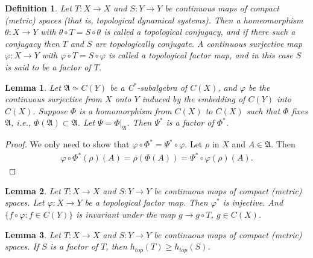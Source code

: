 \documentclass[a4paper,10pt]{amsart}
\newtheorem{definition}{Definition}[section]
\newtheorem{lemma}{Lemma}[section]
\newcommand{\AAA}{\mathfrak A}
\begin{document}
\begin{definition}
Let $T: X \rightarrow X$ and $S:Y \rightarrow Y$ be continuous maps
of compact (metric) spaces (that is, topological dynamical systems). 
Then a homeomorphism $\theta : X \rightarrow Y$ with 
$\theta \circ T = S \circ \theta$ is called a topological conjugacy,
and if there such a conjugacy then $T$ and $S$ are topologically conjugate. 
A continuous surjective map $\varphi : X \rightarrow Y$ with 
$\varphi \circ T = S \circ \varphi$ is called a topological
factor map, and in this case $S$ is said to be a factor of $T$.
\end{definition}

\begin{lemma} \label{w_lem1}
    Let $\AAA \simeq C(Y)$ be a C$^*$-subalgebra of $C(X)$,
    and $\varphi$ be the continuous surjective from $X$ onto
    $Y$ induced by the embedding of $C(Y)$ into $C(X)$. 
    Suppose $\varPhi$ is a homomorphism from $C(X)$ to $C(X)$ 
    such that $\varPhi$ fixes $\AAA$, i.e., $\varPhi(\AAA) \subset \AAA$.
    Let $\varPsi = \varPhi|_{\AAA}$. Then 
    $\varPsi^{*}$ is a factor of $\varPhi^{*}$.
\end{lemma}

\begin{proof}
    We only need to show that $\varphi \circ \varPhi^{*} 
    = \varPsi^{*} \circ \varphi$. 
   Let $\rho$ in $X$ and $A \in \AAA$. Then
   \begin{align*}
    \varphi \circ \varPhi^{*}(\rho)(A) = \rho(\varPhi(A))
    = \varPsi^{*}\circ \varphi (\rho)(A).
   \end{align*}
\end{proof}

\begin{lemma} \label{w_lam2}
Let $T: X \rightarrow X$ and $S:Y \rightarrow Y$ be continuous maps
of compact (metric) spaces. Let $\varphi: X \rightarrow Y$ be a 
topological factor map. Then $\varphi^{*}$ is injective. And 
$\{f \circ \varphi : f \in C(Y) \}$ is invariant under the map
$g \rightarrow g \circ T$, $g \in C(X)$.
\end{lemma}

\begin{lemma} \label{w_lam3}
Let $T: X \rightarrow X$ and $S:Y \rightarrow Y$ be continuous maps
of compact (metric) spaces. If $S$ is a factor of $T$, then
$h_{top}(T) \geq h_{top}(S)$.
\end{lemma}
\end{document}
